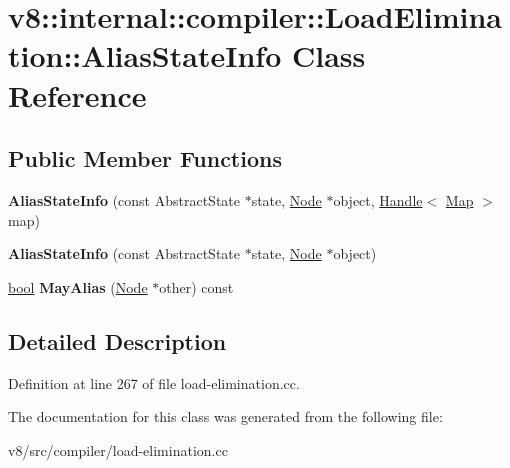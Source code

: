 \hypertarget{classv8_1_1internal_1_1compiler_1_1LoadElimination_1_1AliasStateInfo}{}\section{v8\+:\+:internal\+:\+:compiler\+:\+:Load\+Elimination\+:\+:Alias\+State\+Info Class Reference}
\label{classv8_1_1internal_1_1compiler_1_1LoadElimination_1_1AliasStateInfo}
\subsection*{Public Member Functions}
\begin{DoxyCompactItemize}
\item 
\mbox{\label{classv8_1_1internal_1_1compiler_1_1LoadElimination_1_1AliasStateInfo_ac706d8b05c8b12339f76b931c27da83f}} 
{\bfseries Alias\+State\+Info} (const Abstract\+State $\ast$state, \mbox{\hyperlink{classv8_1_1internal_1_1compiler_1_1Node}{Node}} $\ast$object, \mbox{\hyperlink{classv8_1_1internal_1_1Handle}{Handle}}$<$ \mbox{\hyperlink{classv8_1_1internal_1_1Map}{Map}} $>$ map)
\item 
\mbox{\label{classv8_1_1internal_1_1compiler_1_1LoadElimination_1_1AliasStateInfo_a2eea99e8fd92b1e648fd87456e17240e}} 
{\bfseries Alias\+State\+Info} (const Abstract\+State $\ast$state, \mbox{\hyperlink{classv8_1_1internal_1_1compiler_1_1Node}{Node}} $\ast$object)
\item 
\mbox{\label{classv8_1_1internal_1_1compiler_1_1LoadElimination_1_1AliasStateInfo_ab7e10ef62acb015e743b66fc8e6ffd5a}} 
\mbox{\hyperlink{classbool}{bool}} {\bfseries May\+Alias} (\mbox{\hyperlink{classv8_1_1internal_1_1compiler_1_1Node}{Node}} $\ast$other) const
\end{DoxyCompactItemize}


\subsection{Detailed Description}


Definition at line 267 of file load-\/elimination.\+cc.



The documentation for this class was generated from the following file\+:\begin{DoxyCompactItemize}
\item 
v8/src/compiler/load-\/elimination.\+cc\end{DoxyCompactItemize}
